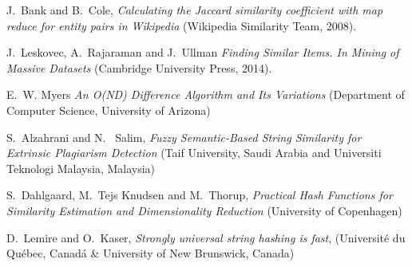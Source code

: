 \documentclass[12pt]{article}
\begin{document}
\begin{thebibliography}{100}

J.\ Bank and B.\ Cole,
\textit {Calculating the Jaccard similarity coefficient with map reduce for entity pairs in
Wikipedia} (Wikipedia Similarity Team, 2008).

J.\ Leskovec, A.\ Rajaraman and J.\ Ullman
\textit{ Finding Similar Items. In Mining of Massive Datasets} (Cambridge University Press, 2014).

E.\ W. Myers \textit{An O(ND) Difference Algorithm and Its Variations} (Department of Computer Science, University of Arizona)

S.\ Alzahrani and N. \ Salim, \textit{Fuzzy Semantic-Based String Similarity for Extrinsic Plagiarism Detection} (Taif University, Saudi Arabia and Universiti Teknologi Malaysia, Malaysia)

S.\ Dahlgaard, M.\ Tejs Knudsen and M.\ Thorup, \textit{Practical Hash Functions for Similarity Estimation and Dimensionality Reduction} (University of Copenhagen)

D.\ Lemire and O.\ Kaser, \textit{Strongly universal string hashing is fast}, (Université du Québec, Canadá & University of New Brunswick, Canada) 
\end{thebibliography}
\end{document}
